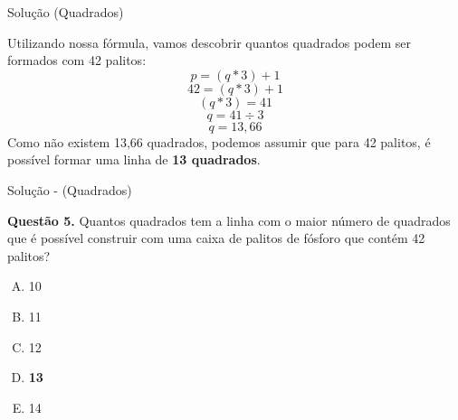 \documentclass{beamer}
\begin{document}
\begin{frame}{Solução (Quadrados)}

Utilizando nossa fórmula, vamos descobrir quantos quadrados podem ser formados com 42 palitos:
\begin{equation*}
    p = (q \ast 3) + 1
\end{equation*}
\pause
    \begin{equation*}
        42 = (q \ast 3) + 1
    \end{equation*}
\pause
    \begin{equation*}
       (q \ast 3) = 41
    \end{equation*}
\pause
    \begin{equation*}
      q = 41 \div 3
    \end{equation*}
\pause
    \begin{equation*}
    q = 13,66
    \end{equation*}
\pause
    Como não existem 13,66 quadrados, podemos assumir que para 42 palitos, é possível formar uma linha de \textbf{13 quadrados}. 
\end{frame}


\begin{frame}{Solução - (Quadrados)}

\textbf{Questão 5.} Quantos quadrados tem a linha com o maior número de quadrados que é possível construir com uma caixa de palitos de  fósforo que contém 42 palitos?

\begin{enumerate}[(A)]
    \item 10
    \item 11
    \item 12
    \item \textbf{13}
    \item 14
\end{enumerate}
\end{frame}
 
 
\end{document}
